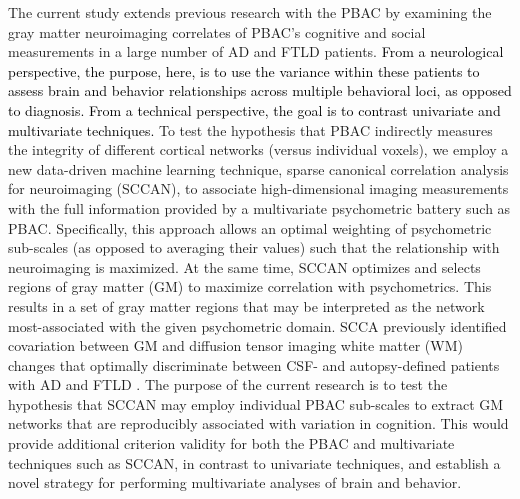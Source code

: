 \documentclass[preprint,authoryear,12pt]{elsarticle}
\begin{document}
The current study extends previous research with the PBAC \citet{libon_philadelphia_2011} by examining the gray matter neuroimaging correlates of PBAC's cognitive and social measurements in a large number of AD and FTLD patients.  \textcolor{black}{From a neurological perspective, the purpose, here, is to use the variance within these patients to assess brain and behavior relationships across multiple behavioral loci, as opposed to diagnosis.  From a technical perspective, the goal is to contrast univariate and multivariate techniques.}  To test the hypothesis that PBAC indirectly measures the integrity of different cortical networks (versus individual voxels), we employ a new data-driven machine learning technique, sparse canonical correlation analysis for neuroimaging (SCCAN), to associate high-dimensional imaging measurements with the full information provided by a multivariate psychometric battery such as PBAC.  Specifically, this approach allows an optimal weighting of psychometric sub-scales (as opposed to averaging their values) such that the relationship with neuroimaging is maximized.  At the same time, SCCAN optimizes and selects regions of gray matter (GM) to maximize correlation with psychometrics.  This results in a set of gray matter regions that may be interpreted as the network most-associated with the given psychometric domain.  SCCA previously identified covariation between GM and diffusion tensor imaging white matter (WM) changes that optimally discriminate between CSF- and autopsy-defined patients with AD and FTLD \citet{Avants2010b}.  The purpose of the current research is to test the hypothesis that SCCAN may employ individual PBAC sub-scales to extract GM networks that are reproducibly associated with variation in cognition.  This would provide additional criterion validity for both the PBAC and multivariate techniques such as SCCAN, in contrast to univariate techniques, and establish a novel strategy for performing multivariate analyses of brain and behavior. 
\end{document}
